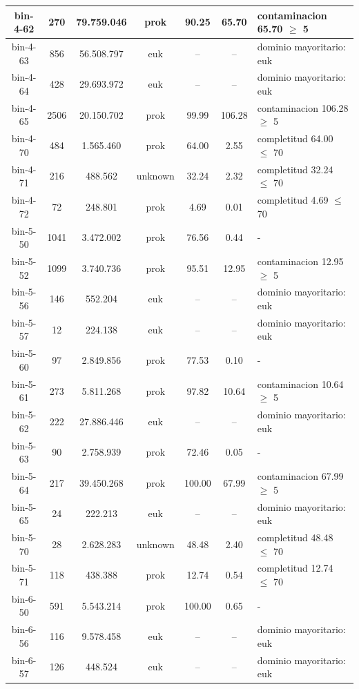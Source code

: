 \begin{xltabular}{\textwidth}{|c|c|c|c|c|c|>{\centering\arraybackslash}X|}
bin-4-62 & 270 & 79.759.046 & prok & 90.25 & 65.70 & contaminacion 65.70 $\ge$ 5 \\ \hline
bin-4-63 & 856 & 56.508.797 & euk & -- & -- & dominio mayoritario: euk \\ \hline
bin-4-64 & 428 & 29.693.972 & euk & -- & -- & dominio mayoritario: euk \\ \hline
bin-4-65 & 2506 & 20.150.702 & prok & 99.99 & 106.28 & contaminacion 106.28 $\ge$ 5 \\ \hline
bin-4-70 & 484 & 1.565.460 & prok & 64.00 & 2.55 & completitud 64.00 $\le$ 70 \\ \hline
bin-4-71 & 216 & 488.562 & unknown & 32.24 & 2.32 & completitud 32.24 $\le$ 70 \\ \hline
bin-4-72 & 72 & 248.801 & prok & 4.69 & 0.01 & completitud 4.69 $\le$ 70 \\ \hline
bin-5-50 & 1041 & 3.472.002 & prok & 76.56 & 0.44 & - \\ \hline
bin-5-52 & 1099 & 3.740.736 & prok & 95.51 & 12.95 & contaminacion 12.95 $\ge$ 5 \\ \hline
bin-5-56 & 146 & 552.204 & euk & -- & -- & dominio mayoritario: euk \\ \hline
bin-5-57 & 12 & 224.138 & euk & -- & -- & dominio mayoritario: euk \\ \hline
bin-5-60 & 97 & 2.849.856 & prok & 77.53 & 0.10 & - \\ \hline
bin-5-61 & 273 & 5.811.268 & prok & 97.82 & 10.64 & contaminacion 10.64 $\ge$ 5 \\ \hline
bin-5-62 & 222 & 27.886.446 & euk & -- & -- & dominio mayoritario: euk \\ \hline
bin-5-63 & 90 & 2.758.939 & prok & 72.46 & 0.05 & - \\ \hline
bin-5-64 & 217 & 39.450.268 & prok & 100.00 & 67.99 & contaminacion 67.99 $\ge$ 5 \\ \hline
bin-5-65 & 24 & 222.213 & euk & -- & -- & dominio mayoritario: euk \\ \hline
bin-5-70 & 28 & 2.628.283 & unknown & 48.48 & 2.40 & completitud 48.48 $\le$ 70 \\ \hline
bin-5-71 & 118 & 438.388 & prok & 12.74 & 0.54 & completitud 12.74 $\le$ 70 \\ \hline
bin-6-50 & 591 & 5.543.214 & prok & 100.00 & 0.65 & - \\ \hline
bin-6-56 & 116 & 9.578.458 & euk & -- & -- & dominio mayoritario: euk \\ \hline
bin-6-57 & 126 & 448.524 & euk & -- & -- & dominio mayoritario: euk \\ \hline

\end{xltabular}

